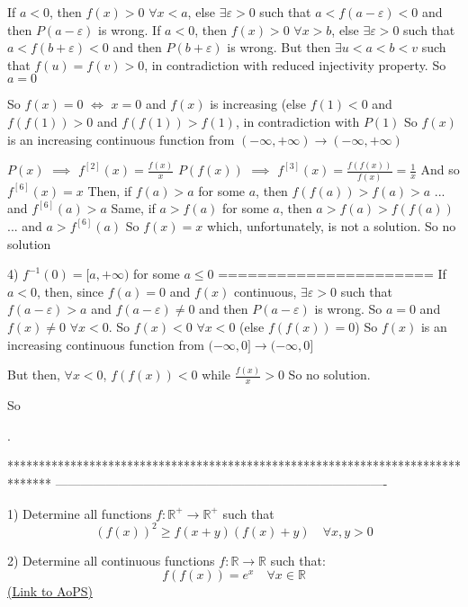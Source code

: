 \begin{solution}
If $a<0$, then $f(x)>0$ $\forall x<a$, else $\exists \varepsilon>0$ such that $a<f(a-\varepsilon)<0$ and then $P(a-\varepsilon)$ is wrong.
If $a<0$, then $f(x)>0$ $\forall x>b$, else $\exists \varepsilon>0$ such that $a<f(b+\varepsilon)<0$ and then $P(b+\varepsilon)$ is wrong.
But then  $\exists u<a<b<v$ such that $f(u)=f(v)>0$, in contradiction with reduced injectivity property.
So $a=0$

So $f(x)=0$ $\iff$ $x=0$ and $f(x)$ is increasing (else $f(1)<0$ and $f(f(1))>0$ and $f(f(1))>f(1)$, in contradiction with $P(1)$
So $f(x)$ is an increasing continuous function from $(-\infty,+\infty)\to(-\infty,+\infty)$

$P(x)$ $\implies$ $f^{[2]}(x)=\frac {f(x)}x$
$P(f(x))$ $\implies$ $f^{[3]}(x)=\frac {f(f(x))}{f(x)}=\frac 1x$
And so $f^{[6]}(x)=x$
Then, if $f(a)>a$ for some $a$, then $f(f(a))>f(a)>a$ ... and $f^{[6]}(a)>a$
Same, if $a>f(a)$ for some $a$, then $a>f(a)>f(f(a))$ ... and $a>f^{[6]}(a)$
So $f(x)=x$ which, unfortunately, is not a solution.
So no solution

4) $f^{-1}(0)=[a,+\infty)$ for some $a\le 0$
======================
If $a<0$, then, since $f(a)=0$ and $f(x)$ continuous, $\exists \varepsilon>0$ such that $f(a-\varepsilon)>a$ and $f(a-\varepsilon)\ne 0$ and then $P(a-\varepsilon)$ is wrong.
So $a=0$ and $f(x)\ne 0$ $\forall x<0$. So $f(x)<0$ $\forall x<0$ (else $f(f(x))=0$)
So $f(x)$ is an increasing continuous function from $(-\infty,0]\to(-\infty,0]$

But then, $\forall x<0$, $f(f(x))<0$ while $\frac{f(x)}x>0$
So no solution.

So .
\end{solution}
*******************************************************************************
-------------------------------------------------------------------------------

\begin{problem}
	1) Determine all  functions $f: \mathbb {R}^{+}\to\mathbb {R}^{+}$ such that
\[(f (x) )^ 2 \geq  f (x + y) (f (x) + y) \quad \forall x,y> 0\]

2) Determine all continuous functions $f: \mathbb R\to\mathbb R$ such that:
\[f(f (x)) = e^{x} \quad \forall x\in\mathbb R\]
	\flushright \href{https://artofproblemsolving.com/community/c6h566766}{(Link to AoPS)}
\end{problem}




